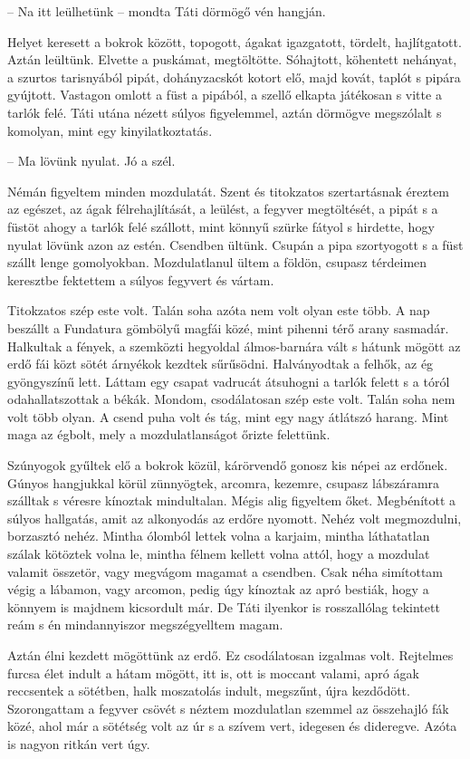 \documentclass{IEEEtran}
\begin{document}
– Na itt leülhetünk – mondta Táti dörmögő vén hangján.

Helyet keresett a bokrok között, topogott, ágakat igazgatott, tördelt, hajlítgatott. Aztán leültünk. Elvette a puskámat, megtöltötte. Sóhajtott, köhentett nehányat, a szurtos tarisnyából pipát, dohányzacskót kotort elő, majd kovát, taplót s pipára gyújtott. Vastagon omlott a füst a pipából, a szellő elkapta játékosan s vitte a tarlók felé. Táti utána nézett súlyos figyelemmel, aztán dörmögve megszólalt s komolyan, mint egy kinyilatkoztatás.

– Ma lövünk nyulat. Jó a szél.

Némán figyeltem minden mozdulatát. Szent és titokzatos szertartásnak éreztem az egészet, az ágak félrehajlítását, a leülést, a fegyver megtöltését, a pipát s a füstöt ahogy a tarlók felé szállott, mint könnyű szürke fátyol s hirdette, hogy nyulat lövünk azon az estén. Csendben ültünk. Csupán a pipa szortyogott s a füst szállt lenge gomolyokban. Mozdulatlanul ültem a földön, csupasz térdeimen keresztbe fektettem a súlyos fegyvert és vártam.

Titokzatos szép este volt. Talán soha azóta nem volt olyan este több. A nap beszállt a Fundatura gömbölyű magfái közé, mint pihenni térő arany sasmadár. Halkultak a fények, a szemközti hegyoldal álmos-barnára vált s hátunk mögött az erdő fái közt sötét árnyékok kezdtek sűrűsödni. Halványodtak a felhők, az ég gyöngyszínű lett. Láttam egy csapat vadrucát átsuhogni a tarlók felett s a tóról odahallatszottak a békák. Mondom, csodálatosan szép este volt. Talán soha nem volt több olyan. A csend puha volt és tág, mint egy nagy átlátszó harang. Mint maga az égbolt, mely a mozdulatlanságot őrizte felettünk.

Szúnyogok gyűltek elő a bokrok közül, kárörvendő gonosz kis népei az erdőnek. Gúnyos hangjukkal körül zünnyögtek, arcomra, kezemre, csupasz lábszáramra szálltak s véresre kínoztak mindultalan. Mégis alig figyeltem őket. Megbénított a súlyos hallgatás, amit az alkonyodás az erdőre nyomott. Nehéz volt megmozdulni, borzasztó nehéz. Mintha ólomból lettek volna a karjaim, mintha láthatatlan szálak kötöztek volna le, mintha félnem kellett volna attól, hogy a mozdulat valamit összetör, vagy megvágom magamat a csendben. Csak néha simítottam végig a lábamon, vagy arcomon, pedig úgy kínoztak az apró bestiák, hogy a könnyem is majdnem kicsordult már. De Táti ilyenkor is rosszallólag tekintett reám s én mindannyiszor megszégyelltem magam.

Aztán élni kezdett mögöttünk az erdő. Ez csodálatosan izgalmas volt. Rejtelmes furcsa élet indult a hátam mögött, itt is, ott is moccant valami, apró ágak reccsentek a sötétben, halk moszatolás indult, megszűnt, újra kezdődött. Szorongattam a fegyver csövét s néztem mozdulatlan szemmel az összehajló fák közé, ahol már a sötétség volt az úr s a szívem vert, idegesen és dideregve. Azóta is nagyon ritkán vert úgy.
\end{document}
